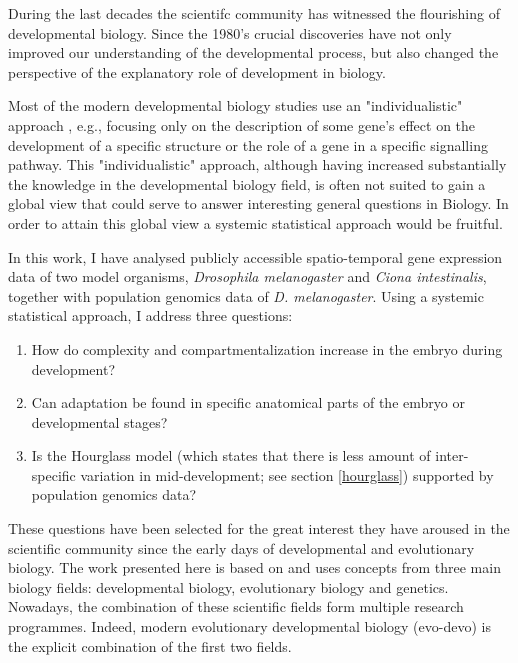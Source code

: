 
During the last decades the scientifc community has witnessed the flourishing of developmental biology. Since the 1980's crucial discoveries \citep{Gilbert1998} have not only improved our understanding of the developmental process, but also changed the perspective of the explanatory role of development in biology.

Most of the modern developmental biology studies use an "individualistic" approach \citep{Davidson2009}, e.g., focusing only on the description of some gene's effect on the development of a specific structure or the role of a gene in a specific signalling pathway.
%
This "individualistic" approach, although having increased substantially the knowledge in the developmental biology field, is often not suited to gain a global view that could serve to answer interesting general questions in Biology. 
%
In order to attain this global view a systemic statistical approach would be fruitful.
%

In this work, I have analysed publicly accessible spatio-temporal gene expression data of two model organisms, \textit{Drosophila melanogaster} and \textit{Ciona intestinalis}, together with population genomics data of \textit{D. melanogaster}.
Using a systemic statistical approach, I address three questions:
\begin{enumerate}
\item How do complexity and compartmentalization increase in the embryo during development?
\item Can adaptation be found in specific anatomical parts of the embryo or developmental stages? 
\item Is the Hourglass model (which states that there is less amount of inter-specific variation in mid-development; see section \ref{hourglass}) supported by population genomics data?
\end{enumerate}

These questions have been selected for the great interest they have aroused in the scientific community since the early days of developmental and evolutionary biology.
%
The work presented here is based on and uses concepts from three main biology fields: 
developmental biology, evolutionary biology and genetics.
Nowadays, the combination of these scientific fields form multiple research programmes. Indeed, modern evolutionary developmental biology (evo-devo) is the explicit combination of the first two fields.

